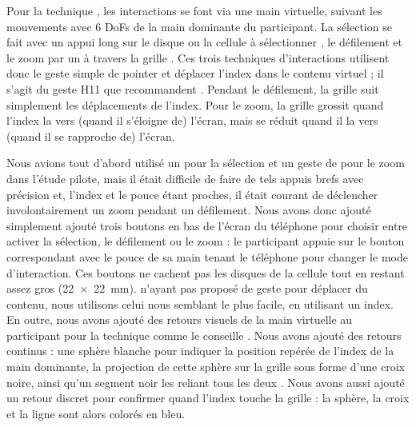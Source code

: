 
Pour la technique , les interactions se font via une main virtuelle, suivant les mouvements avec 6 DoFs de la main dominante du participant. La sélection se fait avec un appui long sur le disque ou la cellule à sélectionner , le défilement et le zoom par un  à travers la grille . Ces trois techniques d'interactions utilisent donc le geste simple de pointer et déplacer l'index dans le contenu virtuel ; il s'agit du geste H11 que \cite{Piumsomboon2013} recommandent . Pendant le défilement, la grille suit simplement les déplacements de l'index. Pour le zoom, la grille grossit quand l'index la  vers (quand il s'éloigne de) l'écran, mais se réduit quand il la  vers (quand il se rapproche de) l'écran.

Nous avions tout d'abord utilisé un  pour la sélection et un geste de  pour le zoom dans l'étude pilote, mais il était difficile de faire de tels appuis brefs avec précision et, l'index et le pouce étant proches, il était courant de déclencher involontairement un zoom pendant un défilement. Nous avons donc ajouté simplement ajouté trois boutons en bas de l'écran du téléphone pour choisir entre activer la sélection, le défilement ou le zoom : le participant appuie sur le bouton correspondant avec le pouce de sa main tenant le téléphone pour changer le mode d'interaction. Ces boutons ne cachent pas les disques de la cellule  tout en restant assez gros (\SI{22x22}{\mm}). \cite{Piumsomboon2013} n'ayant pas proposé de geste pour déplacer du contenu, nous utilisons celui nous semblant le plus facile, en utilisant un index. 
En outre, nous avons ajouté des retours visuels de la main virtuelle au participant pour la technique  comme le conseille \cite{Chan2010}. Nous avons ajouté des retours continus : une sphère blanche pour indiquer la position repérée de l'index de la main dominante, la projection de cette sphère sur la grille sous forme d'une croix noire, ainsi qu'un segment noir les reliant tous les deux . Nous avons aussi ajouté un retour discret pour confirmer quand l'index touche la grille : la sphère, la croix et la ligne sont alors colorés en bleu.

